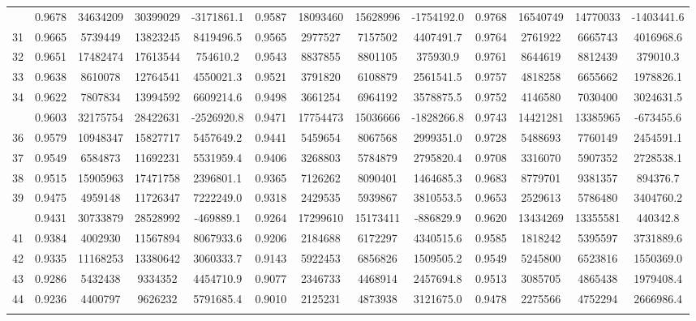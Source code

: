 \documentclass[
  12pt,
]{article}
\begin{document}
\begin{longtable}[t]{lcccccccccccc}
\addlinespace
30 & 0.9678 & 34634209 & 30399029 & -3171861.1 & 0.9587 & 18093460 & 15628996 & -1754192.0 & 0.9768 & 16540749 & 14770033 & -1403441.6\\
31 & 0.9665 & 5739449 & 13823245 & 8419496.5 & 0.9565 & 2977527 & 7157502 & 4407491.7 & 0.9764 & 2761922 & 6665743 & 4016968.6\\
32 & 0.9651 & 17482474 & 17613544 & 754610.2 & 0.9543 & 8837855 & 8801105 & 375930.9 & 0.9761 & 8644619 & 8812439 & 379010.3\\
33 & 0.9638 & 8610078 & 12764541 & 4550021.3 & 0.9521 & 3791820 & 6108879 & 2561541.5 & 0.9757 & 4818258 & 6655662 & 1978826.1\\
34 & 0.9622 & 7807834 & 13994592 & 6609214.6 & 0.9498 & 3661254 & 6964192 & 3578875.5 & 0.9752 & 4146580 & 7030400 & 3024631.5\\
\addlinespace
35 & 0.9603 & 32175754 & 28422631 & -2526920.8 & 0.9471 & 17754473 & 15036666 & -1828266.8 & 0.9743 & 14421281 & 13385965 & -673455.6\\
36 & 0.9579 & 10948347 & 15827717 & 5457649.2 & 0.9441 & 5459654 & 8067568 & 2999351.0 & 0.9728 & 5488693 & 7760149 & 2454591.1\\
37 & 0.9549 & 6584873 & 11692231 & 5531959.4 & 0.9406 & 3268803 & 5784879 & 2795820.4 & 0.9708 & 3316070 & 5907352 & 2728538.1\\
38 & 0.9515 & 15905963 & 17471758 & 2396801.1 & 0.9365 & 7126262 & 8090401 & 1464685.3 & 0.9683 & 8779701 & 9381357 & 894376.7\\
39 & 0.9475 & 4959148 & 11726347 & 7222249.0 & 0.9318 & 2429535 & 5939867 & 3810553.5 & 0.9653 & 2529613 & 5786480 & 3404760.2\\
\addlinespace
40 & 0.9431 & 30733879 & 28528992 & -469889.1 & 0.9264 & 17299610 & 15173411 & -886829.9 & 0.9620 & 13434269 & 13355581 & 440342.8\\
41 & 0.9384 & 4002930 & 11567894 & 8067933.6 & 0.9206 & 2184688 & 6172297 & 4340515.6 & 0.9585 & 1818242 & 5395597 & 3731889.6\\
42 & 0.9335 & 11168253 & 13380642 & 3060333.7 & 0.9143 & 5922453 & 6856826 & 1509505.2 & 0.9549 & 5245800 & 6523816 & 1550369.0\\
43 & 0.9286 & 5432438 & 9334352 & 4454710.9 & 0.9077 & 2346733 & 4468914 & 2457694.8 & 0.9513 & 3085705 & 4865438 & 1979408.4\\
44 & 0.9236 & 4400797 & 9626232 & 5791685.4 & 0.9010 & 2125231 & 4873938 & 3121675.0 & 0.9478 & 2275566 & 4752294 & 2666986.4\\
\addlinespace

\end{longtable}
\end{document}
